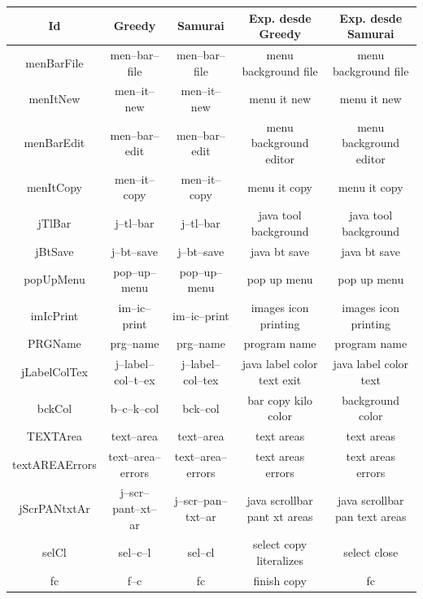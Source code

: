 \begin{table}

		\centering
   		\begin{tabular}{| c | c | c | c | c |}     
   		
       \hline
  	   \textbf{Id} & \textbf{Greedy} & \textbf{Samurai} & \textbf{Exp. desde Greedy} & \textbf{Exp. desde Samurai} \\ \hline

menBarFile&men--bar--file&men--bar--file&menu background file&menu background file\\ \hline
menItNew&men--it--new&men--it--new&menu it new&menu it new\\ \hline
menBarEdit&men--bar--edit&men--bar--edit&menu background editor&menu background editor\\ \hline
menItCopy&men--it--copy&men--it--copy&menu it copy&menu it copy\\ \hline
jTlBar&j--tl--bar&j--tl--bar&java tool background&java tool background\\ \hline
jBtSave&j--bt--save&j--bt--save&java bt save&java bt save\\ \hline
popUpMenu&pop--up--menu&pop--up--menu&pop up menu&pop up menu\\ \hline
imIcPrint&im--ic--print&im--ic--print&images icon printing&images icon printing\\ \hline
PRGName&prg--name&prg--name&program name&program name\\ \hline
jLabelColTex&j--label--col--t--ex&j--label--col--tex&java label color text exit&java label color text\\ \hline
bckCol&b--c--k--col&bck--col&bar copy kilo color&background color\\ \hline
TEXTArea&text--area&text--area&text areas&text areas\\ \hline
textAREAErrors&text--area--errors&text--area--errors&text areas errors&text areas errors\\ \hline
jScrPANtxtAr&j--scr--pant--xt--ar&j--scr--pan--txt--ar&java scrollbar pant xt areas&java scrollbar pan text areas\\ \hline
selCl&sel--c--l&sel--cl&select copy literalizes&select close\\ \hline
fc&f--c&fc&finish copy&fc\\ \hline

\end{tabular}
\end{table}
